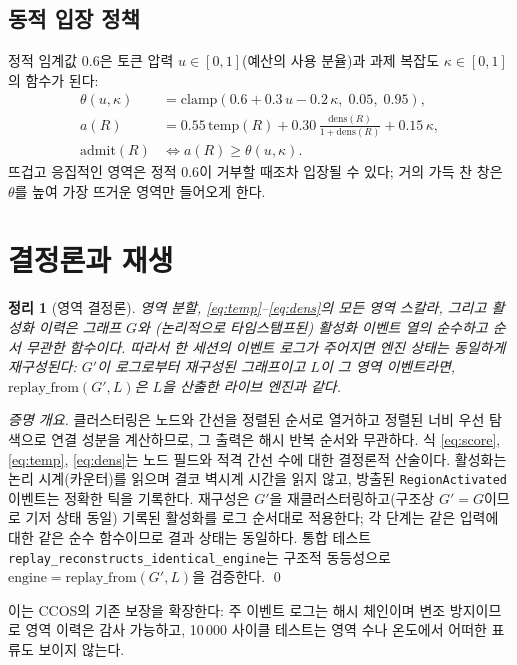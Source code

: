 \documentclass[11pt]{article}
\newtheorem{theorem}{정리}
\newcommand{\code}[1]{\texttt{#1}}
\begin{document}
\subsection{동적 입장 정책}\label{sec:policy}

정적 임계값 $0.6$은 토큰 압력 $u\in[0,1]$(예산의 사용 분율)과 과제 복잡도 $\kappa\in[0,1]$의 함수가 된다:
\begin{align}
\theta(u,\kappa)       &= \mathrm{clamp}(0.6 + 0.3\,u - 0.2\,\kappa,\; 0.05,\; 0.95), \\
a(R)                   &= 0.55\,\mathrm{temp}(R) + 0.30\,\frac{\mathrm{dens}(R)}{1+\mathrm{dens}(R)} + 0.15\,\kappa, \\
\mathrm{admit}(R)      &\iff a(R) \ge \theta(u,\kappa).
\end{align}
뜨겁고 응집적인 영역은 정적 $0.6$이 거부할 때조차 입장될 수 있다; 거의 가득 찬 창은 $\theta$를 높여 가장 뜨거운
영역만 들어오게 한다.

\section{결정론과 재생}\label{sec:determinism}

\begin{theorem}[영역 결정론]
영역 분할, \eqref{eq:temp}--\eqref{eq:dens}의 모든 영역 스칼라, 그리고 활성화 이력은 그래프 $G$와 (논리적으로
타임스탬프된) 활성화 이벤트 열의 순수하고 순서 무관한 함수이다. 따라서 한 세션의 이벤트 로그가 주어지면 엔진
상태는 동일하게 재구성된다: $G'$이 로그로부터 재구성된 그래프이고 $L$이 그 영역 이벤트라면,
$\mathrm{replay\_from}(G',L)$은 $L$을 산출한 라이브 엔진과 같다.
\end{theorem}
\begin{proof}[증명 개요]
클러스터링은 노드와 간선을 정렬된 순서로 열거하고 정렬된 너비 우선 탐색으로 연결 성분을 계산하므로, 그 출력은
해시 반복 순서와 무관하다. 식 \eqref{eq:score}, \eqref{eq:temp}, \eqref{eq:dens}는 노드 필드와 적격 간선 수에
대한 결정론적 산술이다. 활성화는 논리 시계(카운터)를 읽으며 결코 벽시계 시간을 읽지 않고, 방출된
\code{RegionActivated} 이벤트는 정확한 틱을 기록한다. 재구성은 $G'$을 재클러스터링하고(구조상 $G'\!=\!G$이므로
기저 상태 동일) 기록된 활성화를 로그 순서대로 적용한다; 각 단계는 같은 입력에 대한 같은 순수 함수이므로 결과
상태는 동일하다. 통합 테스트 \code{replay\_reconstructs\_identical\_engine}는 구조적 동등성으로
$\mathrm{engine}=\mathrm{replay\_from}(G',L)$을 검증한다. \qed
\end{proof}

이는 CCOS의 기존 보장을 확장한다: 주 이벤트 로그는 해시 체인이며 변조 방지이므로 영역 이력은 감사 가능하고,
10\,000 사이클 테스트는 영역 수나 온도에서 어떠한 표류도 보이지 않는다.
\end{document}
